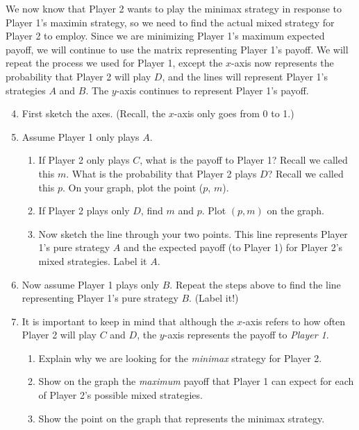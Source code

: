 We now know that Player 2 wants to play the minimax strategy in response to Player 1's maximin strategy, so we need to find the actual mixed strategy for Player 2 to employ. Since we are minimizing Player 1's maximum expected payoff, we will continue to use the matrix representing Player 1's payoff. We will repeat the process we used for Player 1, except the $x$-axis now represents the probability that Player 2 will play $D$, and the lines will represent Player 1's strategies $A$ and $B$. The $y$-axis continues to represent Player 1's payoff. 

\begin{enumerate}
\setcounter{enumi}{3}
\item First sketch the axes. (Recall, the $x$-axis only goes from 0 to 1.)
\vspace{.1 in}

\item Assume Player 1 only plays $A$. 
\begin{enumerate}
\item If Player 2 only plays $C$, what is the payoff to Player 1? Recall we called this $m$. What is the probability that Player 2 plays $D$? Recall we called this $p$. On your graph, plot the point ($p$, $m$).

\item If Player 2 plays only $D$, find $m$ and $p$. Plot $(p, m)$ on the graph.

\item Now sketch the line through your two points. This line represents Player 1's pure strategy $A$ and the expected payoff (to Player 1) for Player 2's mixed strategies. Label it $A$.
\end{enumerate}

\item Now assume Player 1 plays only $B$. Repeat the steps above to find the line representing Player 1's pure strategy $B$. (Label it!)
\vspace{.1in}

\item It is important to keep in  mind that although the $x$-axis refers to how often Player 2 will play $C$ and $D$, the $y$-axis represents the payoff to {\it Player 1}. 
\begin{enumerate}
\item Explain why we are looking for the {\it minimax} strategy for Player 2. 
\item Show on the graph the {\it maximum} payoff that Player 1 can expect for each of Player 2's possible mixed strategies.
\item Show the point on the graph that represents the minimax strategy.
\end{enumerate}


\end{enumerate}
